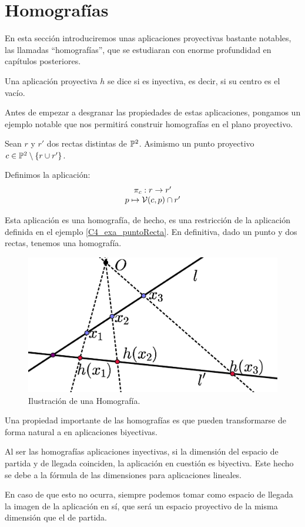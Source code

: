 \section{Homografías}
\label{C4_homografias}
En esta sección introduciremos unas aplicaciones proyectivas bastante notables, las llamadas ``homografías'', que se estudiaran con enorme profundidad en capítulos posteriores.
\begin{defi}[Homografía]
	\label{C4_def_homografia}
	Una aplicación proyectiva $h$ se dice  si es inyectiva, es decir, si su centro es el vacío.
\end{defi}
Antes de empezar a desgranar las propiedades de estas aplicaciones, pongamos un ejemplo notable que nos permitirá construir homografías en el plano proyectivo.
\begin{exa}
	\label{C4_exa_fabricaHomografias}
	Sean $r$ y $r'$ dos rectas distintas de $\mathbb{P}^2$. Asimismo un punto proyectivo $c\in\mathbb{P}^2\setminus\{r\cup r'\}$.
	
	Definimos la aplicación: \[\begin{array}{c}
	\pi_c:r\to r'\\
	p\mapsto \mathcal{V}(c,p)\cap r'
	\end{array}\]
	
	Esta aplicación es una homografía, de hecho, es una restricción de la aplicación definida en el ejemplo \ref{C4_exa_puntoRecta}. En definitiva, dado un punto y dos rectas, tenemos una homografía.
\end{exa}
\begin{figure}[h]
	\centering
	\includegraphics[scale=.3]{Graficos/perspectividad.eps}
	\caption{Ilustración de una Homografía.}
	\label{C4_img_perspectividad}
\end{figure}
Una propiedad importante de las homografías es que pueden transformarse de forma natural a en aplicaciones biyectivas.
\begin{obs}
	Al ser las homografías aplicaciones inyectivas, si la dimensión del espacio de partida y de llegada coinciden, la aplicación en cuestión es biyectiva. Este hecho se debe a la fórmula de las dimensiones para aplicaciones lineales.
	
	En caso de que esto no ocurra, siempre podemos tomar como espacio de llegada la imagen de la aplicación en sí, que será un espacio proyectivo de la misma dimensión que el de partida.
\end{obs}

